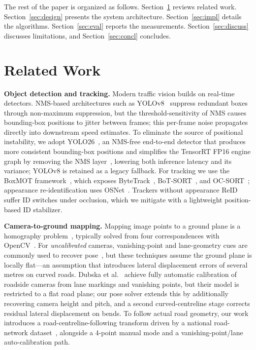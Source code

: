 \documentclass[conference]{IEEEtran}
\renewcommand{\_}{\textunderscore\allowbreak}
\begin{document}
The rest of the paper is organized as follows. Section~\ref{sec:related} reviews
related work. Section~\ref{sec:design} presents the system architecture.
Section~\ref{sec:impl} details the algorithms. Section~\ref{sec:eval} reports the
measurements. Section~\ref{sec:discuss} discusses limitations, and
Section~\ref{sec:concl} concludes.

\section{Related Work}\label{sec:related}
\textbf{Object detection and tracking.} Modern traffic vision builds on real-time
detectors. NMS-based architectures such as YOLOv8~\cite{yolov8} suppress redundant
boxes through non-maximum suppression, but the threshold-sensitivity of NMS causes
bounding-box positions to jitter between frames; this per-frame noise propagates
directly into downstream speed estimates. To eliminate the source of positional
instability, we adopt YOLO26~\cite{yolo26}, an NMS-free end-to-end detector that
produces more consistent bounding-box positions and simplifies the TensorRT FP16
engine graph by removing the NMS layer~\cite{tensorrt}, lowering both inference
latency and its variance; YOLOv8 is retained as a legacy fallback. For tracking we use the BoxMOT
framework~\cite{boxmot}, which exposes ByteTrack~\cite{bytetrack},
BoT-SORT~\cite{botsort}, and OC-SORT~\cite{ocsort}; appearance re-identification
uses OSNet~\cite{osnet}. Trackers without appearance ReID suffer ID switches under
occlusion, which we mitigate with a lightweight position-based ID stabilizer.

\textbf{Camera-to-ground mapping.} Mapping image points to a ground plane is a
homography problem~\cite{hartley2004}, typically solved from four correspondences
with OpenCV~\cite{opencv}. For \emph{uncalibrated} cameras, vanishing-point and
lane-geometry cues are commonly used to recover pose~\cite{dubska2014}, but these techniques assume
the ground plane is locally flat---an assumption that introduces lateral
displacement errors of several metres on curved roads.
Dubska et al.~\cite{dubska2014} achieve fully automatic calibration of roadside
cameras from lane markings and vanishing points, but their model is restricted to
a flat road plane; our pose solver extends this by additionally recovering camera
height and pitch, and a second curved-centreline stage corrects residual lateral
displacement on bends. To follow actual road
geometry, our work introduces a road-centreline-following transform driven by a
national road-network dataset~\cite{moct_nodelink}, alongside a 4-point manual
mode and a vanishing-point/lane auto-calibration path.
\end{document}
